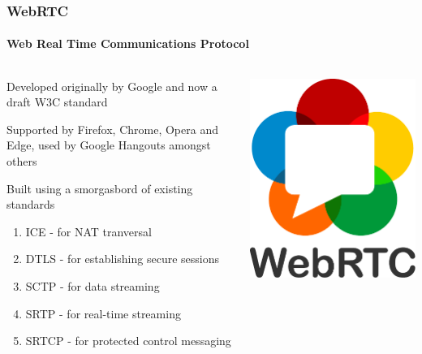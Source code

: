 \documentclass[handout, notes=hide]{beamer}
\begin{document}

\begin{frame}
\frametitle{WebRTC}
\framesubtitle{Web Real Time Communications Protocol}

\begin{columns}[T]
\begin{column}[T]{0.7\textwidth}
\setlength{\parskip}{0.5em}

Developed originally by Google and now a draft W3C standard

Supported by Firefox, Chrome, Opera and Edge, used by Google Hangouts amongst others

Built using a smorgasbord of existing standards

\begin{enumerate}
\item ICE - for NAT tranversal
\item DTLS - for establishing secure sessions
\item SCTP - for data streaming
\item SRTP - for real-time streaming
\item SRTCP - for protected control messaging
\end{enumerate}

\end{column}
\begin{column}[T]{0.3\textwidth}
\vspace{2.5em}
\includegraphics[width=1.0\textwidth]{webrtc-logo-vert-retro-dist}
\end{column}
\end{columns}

\end{frame}
\end{document}
